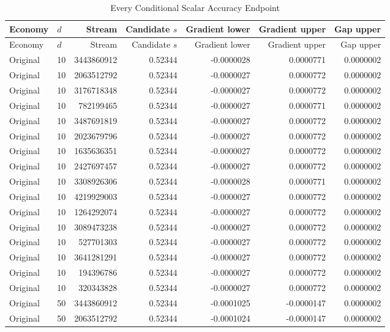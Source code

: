 \begin{longtable}{llrrrrr}
\caption{Every Conditional Scalar Accuracy Endpoint}\label{tab:r16menualscalar}\\
\toprule
Economy & $d$ & Stream & Candidate $s$ & Gradient lower & Gradient upper & Gap upper \\
\midrule
\endfirsthead
\toprule
Economy & $d$ & Stream & Candidate $s$ & Gradient lower & Gradient upper & Gap upper \\
\midrule\endhead
Original & 10 & 3443860912 & 0.52344 & -0.0000028 & 0.0000771 & 0.0000002 \\
Original & 10 & 2063512792 & 0.52344 & -0.0000027 & 0.0000772 & 0.0000002 \\
Original & 10 & 3176718348 & 0.52344 & -0.0000027 & 0.0000772 & 0.0000002 \\
Original & 10 & 782199465 & 0.52344 & -0.0000027 & 0.0000771 & 0.0000002 \\
Original & 10 & 3487691819 & 0.52344 & -0.0000027 & 0.0000772 & 0.0000002 \\
Original & 10 & 2023679796 & 0.52344 & -0.0000027 & 0.0000772 & 0.0000002 \\
Original & 10 & 1635636351 & 0.52344 & -0.0000027 & 0.0000772 & 0.0000002 \\
Original & 10 & 2427697457 & 0.52344 & -0.0000027 & 0.0000772 & 0.0000002 \\
Original & 10 & 3308926306 & 0.52344 & -0.0000028 & 0.0000771 & 0.0000002 \\
Original & 10 & 4219929003 & 0.52344 & -0.0000027 & 0.0000772 & 0.0000002 \\
Original & 10 & 1264292074 & 0.52344 & -0.0000027 & 0.0000772 & 0.0000002 \\
Original & 10 & 3089473238 & 0.52344 & -0.0000027 & 0.0000772 & 0.0000002 \\
Original & 10 & 527701303 & 0.52344 & -0.0000027 & 0.0000772 & 0.0000002 \\
Original & 10 & 3641281291 & 0.52344 & -0.0000027 & 0.0000772 & 0.0000002 \\
Original & 10 & 194396786 & 0.52344 & -0.0000027 & 0.0000772 & 0.0000002 \\
Original & 10 & 320343828 & 0.52344 & -0.0000027 & 0.0000772 & 0.0000002 \\
Original & 50 & 3443860912 & 0.52344 & -0.0001025 & -0.0000147 & 0.0000002 \\
Original & 50 & 2063512792 & 0.52344 & -0.0001024 & -0.0000147 & 0.0000002 \\

\end{longtable}
